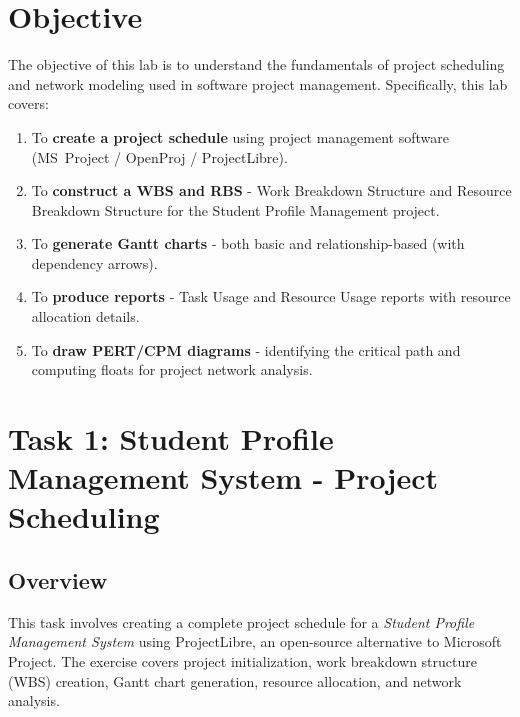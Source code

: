 \documentclass[12pt,a4paper]{article}
\begin{document}
\newpage
\section*{Objective}

The objective of this lab is to understand the fundamentals of project scheduling
and network modeling used in software project management. Specifically, this lab
covers:

\begin{enumerate}[leftmargin=*, itemsep=4pt]
    \item To \textbf{create a project schedule} using project management software
          (MS~Project / OpenProj / ProjectLibre).
    \item To \textbf{construct a WBS and RBS} - Work Breakdown Structure and
          Resource Breakdown Structure for the Student Profile Management project.
    \item To \textbf{generate Gantt charts} - both basic and relationship-based
          (with dependency arrows).
    \item To \textbf{produce reports} - Task Usage and Resource Usage reports
          with resource allocation details.
    \item To \textbf{draw PERT/CPM diagrams} - identifying the critical path
          and computing floats for project network analysis.
\end{enumerate}

\newpage
{}
\setcounter{page}{1}
\section*{Task 1: Student Profile Management System - Project Scheduling}

\subsection*{Overview}

This task involves creating a complete project schedule for a \textit{Student
Profile Management System} using ProjectLibre, an open-source alternative to
Microsoft Project. The exercise covers project initialization, work breakdown
structure (WBS) creation, Gantt chart generation, resource allocation, and
network analysis.
\end{document}
